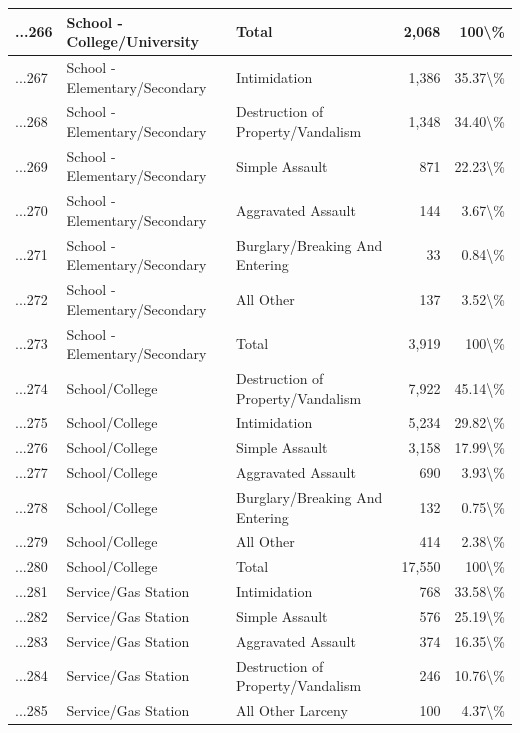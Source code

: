 \documentclass[
]{krantz}
\begin{document}
\begin{longtable}[t]{l|l|l|r|r}
\hline
...266 & School - College/University & Total & 2,068 & 100\textbackslash{}\%\\
\hline
...267 & School - Elementary/Secondary & Intimidation & 1,386 & 35.37\textbackslash{}\%\\
\hline
...268 & School - Elementary/Secondary & Destruction of Property/Vandalism & 1,348 & 34.40\textbackslash{}\%\\
\hline
...269 & School - Elementary/Secondary & Simple Assault & 871 & 22.23\textbackslash{}\%\\
\hline
...270 & School - Elementary/Secondary & Aggravated Assault & 144 & 3.67\textbackslash{}\%\\
\hline
...271 & School - Elementary/Secondary & Burglary/Breaking And Entering & 33 & 0.84\textbackslash{}\%\\
\hline
...272 & School - Elementary/Secondary & All Other & 137 & 3.52\textbackslash{}\%\\
\hline
...273 & School - Elementary/Secondary & Total & 3,919 & 100\textbackslash{}\%\\
\hline
...274 & School/College & Destruction of Property/Vandalism & 7,922 & 45.14\textbackslash{}\%\\
\hline
...275 & School/College & Intimidation & 5,234 & 29.82\textbackslash{}\%\\
\hline
...276 & School/College & Simple Assault & 3,158 & 17.99\textbackslash{}\%\\
\hline
...277 & School/College & Aggravated Assault & 690 & 3.93\textbackslash{}\%\\
\hline
...278 & School/College & Burglary/Breaking And Entering & 132 & 0.75\textbackslash{}\%\\
\hline
...279 & School/College & All Other & 414 & 2.38\textbackslash{}\%\\
\hline
...280 & School/College & Total & 17,550 & 100\textbackslash{}\%\\
\hline
...281 & Service/Gas Station & Intimidation & 768 & 33.58\textbackslash{}\%\\
\hline
...282 & Service/Gas Station & Simple Assault & 576 & 25.19\textbackslash{}\%\\
\hline
...283 & Service/Gas Station & Aggravated Assault & 374 & 16.35\textbackslash{}\%\\
\hline
...284 & Service/Gas Station & Destruction of Property/Vandalism & 246 & 10.76\textbackslash{}\%\\
\hline
...285 & Service/Gas Station & All Other Larceny & 100 & 4.37\textbackslash{}\%\\

\end{longtable}
\end{document}
